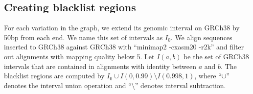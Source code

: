 \documentclass[twocolumn]{bmcart}%
\begin{document}
\subsection*{Creating blacklist regions}

For each variation in the graph, we extend its genomic interval on GRCh38 by
50bp from each end. We name this set of intervals as $I_0$. We align sequences
inserted to GRCh38 against GRCh38 with ``minimap2 -cxasm20 -r2k'' and filter
out alignments with mapping quality below 5. Let $I(a,b)$ be the set of GRCh38
intervals that are contained in alignments with identity between $a$ and $b$.
The blacklist regions are computed by $I_0\cup I(0,0.99)\setminus I(0.998,1)$,
where ``$\cup$'' denotes the interval union operation and ``$\setminus$''
denotes interval subtraction.

\end{document}
